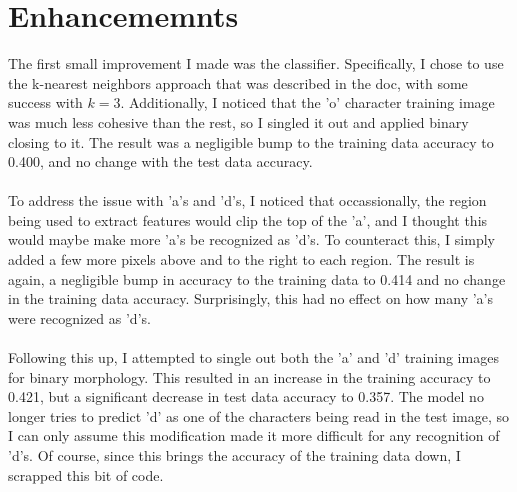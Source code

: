 \documentclass[12pt]{article}
\begin{document}
\section*{Enhancememnts}
The first small improvement I made was the classifier. Specifically, I chose to use the k-nearest neighbors 
approach that was described in the doc, with some success with $k=3$. Additionally, I noticed that 
the 'o' character training image was much less cohesive than the rest, so I singled it out and applied binary closing 
to it. The result was a negligible bump to the training data accuracy to 0.400, and no change with the test data accuracy. 
\\
\\
To address the issue with 'a's and 'd's, I noticed that occassionally, the region being used to extract features 
would clip the top of the 'a', and I thought this would maybe make more 'a's be recognized as 'd's. To counteract this, 
I simply added a few more pixels above and to the right to each region. The result is again, a negligible bump in accuracy to the 
training data to 0.414 and no change in the training data accuracy. Surprisingly, this had no effect on how many 'a's 
were recognized as 'd's. 
\\
\\
Following this up, I attempted to single out both the 'a' and 'd' training images for binary morphology. This resulted in 
an increase in the training accuracy to 0.421, but a significant decrease in test data accuracy to 0.357. The model no longer 
tries to predict 'd' as one of the characters being read in the test image, so I can only assume this modification made it more 
difficult for any recognition of 'd's. Of course, since this brings the accuracy of the training data down, I scrapped this bit of code.
\end{document}
